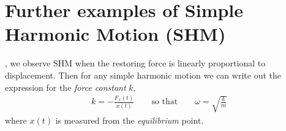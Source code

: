 \section{Further examples of Simple Harmonic Motion (SHM)} 
\vspace{-0.5cm}
, we observe SHM when the restoring force is linearly proportional to displacement. 
Then for any simple harmonic motion we can write out the expression for the \emph{force constant} $k$, 
\begin{align}
k = -\frac{F_x(t)}{x(t)} \qquad \textrm{so that} \qquad \omega = \sqrt{\frac{k}{m}}
\end{align}
where $x(t)$ is measured from the \emph{equilibrium} point. 


